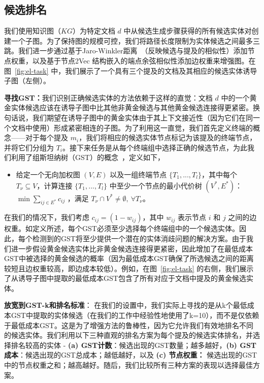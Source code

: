 \documentclass[11pt]{article}
\begin{document}
\subsection{候选排名}

我们使用知识图（$KG$）为特定文档 $d$ 中从候选生成步骤获得的所有候选实体对创建一个子图。为了保持图的规模可控，我们将路径长度限制为实体候选之间最多三跳。我们进一步通过基于Jaro-Winkler距离~\cite{wang2017efficient}（反映候选与提及的相似性）添加节点权重，以及基于节点2Vec \cite{grover2016node2vec}结构嵌入的端点余弦相似性添加边权重来增强图。在图~\ref{fig:el-task} 中，我们展示了一个具有三个提及的文档及其相应的候选实体诱导子图（左侧）。

\noindent
\textbf{寻找GST：}我们识别正确候选实体的方法依赖于这样的直觉：文档 $d$ 中的一个黄金实体候选应该在诱导子图中比其他非黄金候选与其他黄金候选连接得更紧密。换句话说，我们期望在诱导子图中的黄金实体由于其上下文接近性（因为它们在同一个文档中使用）形成紧密相连的子图。为了利用这一直觉，我们首先定义终端的概念——对于每个提及 $m_i$，我们将相应的候选实体节点标记为该提及的终端节点，并将它们分组为 $T_i$。接下来任务是从每个终端组中选择正确的候选节点，为此我们利用了组斯坦纳树（GST）的概念~\cite{ding2006finding,pramanik2024uniqorn}，定义如下， \begin{itemize}[topsep=2pt,itemsep=0pt,partopsep=0pt, parsep=0pt]
\item 给定一个无向加权图 \((V, E)\) 以及一组终端节点 \(\{T_1, . . . ,T_l\}\)，其中每个 \(T_\nu \subseteq V\)，计算连接 \(\{T_1, . . . ,T_l\}\) 中至少一个节点的最小代价树 \((V^*, E^*)\)：\(\min \sum_{ij \in E^*} c_{ij}\) ，满足 \(T_\nu \cap V^* \ne \emptyset, \ \forall T_\nu\)。
\end{itemize} 在我们的情况下，我们考虑 $c_{ij}=(1 - w_{ij})$，其中 $w_{ij}$ 表示节点 $i$ 和 $j$ 之间的边权重。如定义所述，每个GST必须至少选择每个终端组中的一个候选实体。因此，每个检测到的GST将至少提供一个潜在的实体消歧问题的解决方案。由于我们进一步假设黄金候选实体比非黄金候选连接得更紧密，因此增加了在最低成本GST中被选择的黄金候选的概率（因为最低成本GST确保了所选候选之间的距离较短且边权重较高，即边成本较低）。例如，在图~\ref{fig:el-task} 的右侧，我们展示了从诱导子图中提取的最低成本GST包含了所有对应于文档中提及的黄金候选实体。

\noindent
\textbf{放宽到GST-k和排名标准}： 在我们的设置中，我们实际上寻找的是从k个最低成本GST中提取的实体候选（在我们的工作中经验性地使用了k=10），而不是仅依赖于最低成本GST。这是为了增强方法的鲁棒性，因为它允许我们有效地排名不同的候选实体。我们利用以下三种直观的排名方案为每个提及的候选实体排名，并选择排名较高的实体 - \textbf{(a) GST计数}：候选出现的GST数量；越多越好，\textbf{(b) GST成本}：候选出现的GST总成本；越低越好，以及 \textbf{(c) 节点权重：} 候选出现的GST中的节点权重之和；越高越好。随后，我们比较所有三种方案的表现以选择最佳方案。
\end{document}
